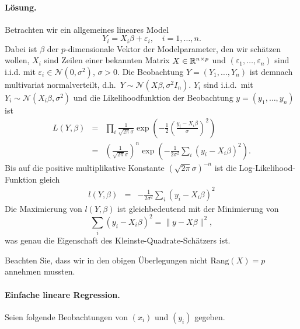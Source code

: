 \paragraph*{Lösung. } Betrachten wir ein allgemeines lineares Model
\begin{equation}
    Y_i =  X_i \beta+ \varepsilon_i, \quad i=1,\ldots,n.
\end{equation}
Dabei ist $\beta$ der $p$-dimensionale Vektor der Modelparameter, den wir schätzen wollen,
$X_i$ sind Zeilen einer bekannten Matrix $X\in\mathbb R^{n\times p}$ und 
$\left( \varepsilon_1, \ldots, \varepsilon_n \right)$ sind i.i.d. mit 
$\varepsilon_i \in\mathcal N(0,\sigma^2)$, $\sigma>0$. Die Beobachtung
$Y=\left( Y_1,\ldots,Y_n \right)$ ist demnach multivariat normalverteilt, d.h.\ 
$Y\sim\mathcal N(X\beta,\sigma^2 I_n)$. $Y_i$ sind i.i.d.\ mit
$Y_i\sim\mathcal N(X_i \beta, \sigma^2 )$ und die Likelihoodfunktion der Beobachtung 
$y=\left( y_1,\ldots, y_n \right)$ ist 
\begin{eqnarray}
    L(Y, \beta) &=&  \prod_i \frac{1}{ \sqrt{2\pi} \sigma} 
    \exp\left( - \frac{1}{2} \left( \frac{y_i - X_i \beta }{\sigma}  \right)^2 \right) \\
    &=& \left( \frac{1}{\sqrt{2\pi}\sigma} \right)^n 
    \exp \left( -\frac{1}{2 \sigma^2} \sum_{i}^{} \left( y_i - X_i\beta \right)^2 \right).
\end{eqnarray}
Bis auf die positive multiplikative Konstante $\left( \sqrt{2 \pi}\sigma \right)^{-n}$ ist 
die Log-Likelihood-Funktion gleich
\begin{eqnarray}
    l(Y, \beta) &=& -\frac{1}{2 \sigma^2}  \sum_{i}^{} \left( y_i - X_i \beta \right)^2 
\end{eqnarray}
Die Maximierung von $l(Y, \beta)$ ist gleichbedeutend mit der Minimierung von 
\begin{equation}
    \sum_{i}^{} \left( y_i - X_i \beta \right)^2 = \| y - X \beta \|^2, 
\end{equation}
was genau die Eigenschaft des Kleinste-Quadrate-Schätzers ist. 

Beachten Sie, dass wir in den obigen Überlegungen nicht
$\textrm{Rang}\left( X \right)=p$ annehmen mussten.






\paragraph{Einfache lineare Regression. } Seien folgende Beobachtungen von
$(x_i)$ und $(y_i)$ 
gegeben.

